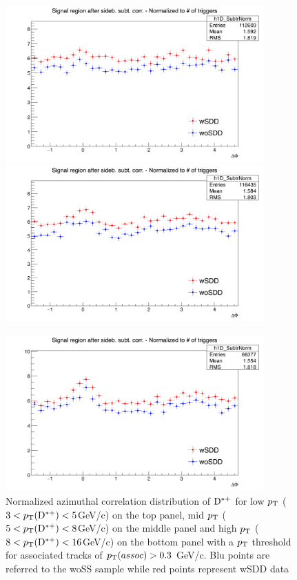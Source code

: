 \begin{figure}[!h]
\centering
\includegraphics[width=0.8\linewidth, height=6cm]{figures/wSDD_vs_woSDD/AzimCorrDistr_Dstar_Canvas_PtIntBins2to3_PoolInt_thr0dot3to99dot0_Superimp.png}
\includegraphics[width=0.8\linewidth, height=6cm]{figures/wSDD_vs_woSDD/AzimCorrDistr_Dstar_Canvas_PtIntBins4to6_PoolInt_thr0dot3to99dot0_Superimp.png}

\includegraphics[width=0.8\linewidth, height=6cm]{figures/wSDD_vs_woSDD/AzimCorrDistr_Dstar_Canvas_PtIntBins7to9_PoolInt_thr0dot3to99dot0_Superimp.png}
\caption{Normalized azimuthal correlation distribution of ${\rm D^{*+}}$ for low $p_{\rm T}$ ($3 < p_{\rm T}({\rm D^{*+}}) < 5 $GeV/c) on the top panel, mid $p_{\rm T}$ ($5 < p_{\rm T}({\rm D^{*+}}) < 8 $GeV/c) on the middle panel and high $p_{\rm T}$ ($8 < p_{\rm T}({\rm D^{*+}}) < 16 $GeV/c) on the bottom panel with a $p_{\rm T}$ threshold for associated tracks of $p_{\rm T}(assoc) > 0.3$ GeV/c. Blu points are referred to the woSS sample while red points represent wSDD data}
\label{wSSvswoSDD}
\end{figure}

